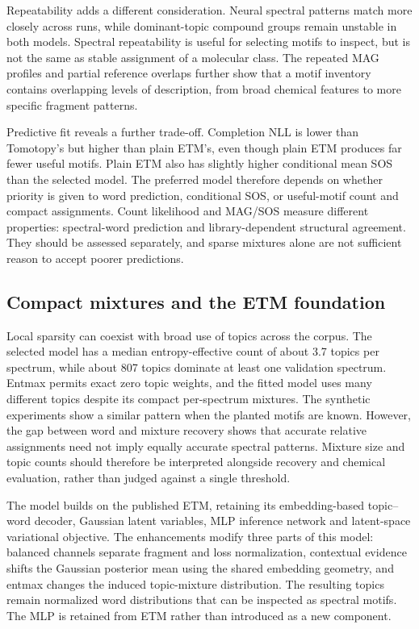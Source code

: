 \documentclass[10pt,a4paper]{article}
\begin{document}
Repeatability adds a different consideration. Neural spectral patterns match
more closely across runs, while dominant-topic compound groups remain
unstable in both models. Spectral repeatability is useful for selecting
motifs to inspect, but is not the same as stable assignment of a molecular
class. The repeated MAG profiles and partial reference overlaps further
show that a motif inventory contains overlapping levels of description,
from broad chemical features to more specific fragment patterns.

Predictive fit reveals a further trade-off. Completion NLL is lower
than Tomotopy's but higher than plain ETM's, even though plain ETM produces
far fewer useful motifs. Plain ETM also has slightly higher conditional mean
SOS than the selected model. The preferred model therefore depends on whether
priority is given to word prediction, conditional SOS, or useful-motif count
and compact assignments. Count likelihood and
MAG/SOS measure different properties: spectral-word prediction and
library-dependent structural agreement. They should be assessed separately,
and sparse mixtures alone are not sufficient reason to accept poorer predictions.

\subsection{Compact mixtures and the ETM foundation}

Local sparsity can coexist with broad use of topics across the corpus.
The selected model has a median entropy-effective count of about 3.7 topics
per spectrum, while about 807 topics dominate at least one validation spectrum.
Entmax permits exact zero topic weights, and the fitted model uses many
different topics despite its compact per-spectrum mixtures. The synthetic
experiments show a similar pattern when the planted motifs are known.
However, the gap between word and mixture recovery shows that accurate
relative assignments need not imply equally accurate spectral patterns.
Mixture size and topic counts should therefore be interpreted alongside
recovery and chemical evaluation, rather than judged against a single threshold.

The model builds on the published ETM, retaining its embedding-based
topic--word decoder, Gaussian latent variables, MLP inference network and
latent-space variational objective. The enhancements modify three parts of
this model: balanced channels separate fragment and loss normalization,
contextual evidence shifts the
Gaussian posterior mean using the shared embedding geometry, and entmax
changes the induced topic-mixture distribution. The resulting topics remain
normalized word distributions that can be inspected as spectral motifs.
The MLP is retained from ETM rather than introduced as a new component.
\end{document}
